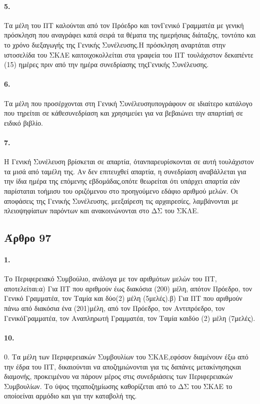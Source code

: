 \documentclass[a4paper,oneside, 10pt]{book}
\begin{document}
\paragraph { 5. } Τα μέλη του ΠΤ καλούνται από τον Πρόεδρο και τονΓενικό Γραμματέα με γενική πρόσκληση που αναγράφει κατά σειρά τα θέματα της ημερήσιας διάταξης, τοντόπο και το χρόνο διεξαγωγής της Γενικής Συνέλευσης.Η πρόσκληση αναρτάται στην ιστοσελίδα του ΣΚΛΕ καιτοιχοκολλείται στα γραφεία του ΠΤ τουλάχιστον δεκαπέντε (15) ημέρες πριν από την ημέρα συνεδρίασης τηςΓενικής Συνέλευσης.
\paragraph { 6. } Τα μέλη που προσέρχονται στη Γενική Συνέλευσηυπογράφουν σε ιδιαίτερο κατάλογο που τηρείται σε κάθεσυνεδρίαση και χρησιμεύει για να βεβαιώνει την απαρτίαή σε ειδικό βιβλίο.
\paragraph { 7. } Η Γενική Συνέλευση βρίσκεται σε απαρτία, ότανπαρευρίσκονται σε αυτή τουλάχιστον τα μισά από ταμέλη της. Αν δεν επιτευχθεί απαρτία, η συνεδρίαση αναβάλλεται για την ίδια ημέρα της επόμενης εβδομάδας,οπότε θεωρείται ότι υπάρχει απαρτία εάν παρίσταται τοήμισυ του οριζόμενου στο προηγούμενο εδάφιο αριθμού μελών. Οι αποφάσεις της Γενικής Συνέλευσης, μεεξαίρεση τις αρχαιρεσίες, λαμβάνονται με πλειοψηφίατων παρόντων και ανακοινώνονται στο ΔΣ του ΣΚΛΕ.
\subsection*{ Άρθρο 97 }
\paragraph { 1. } Το Περιφερειακό Συμβούλιο, ανάλογα με τον αριθμότων μελών του ΠΤ, αποτελείται:α) Για ΠΤ που αριθμούν έως διακόσια (200) μέλη, απότον Πρόεδρο, τον Γενικό Γραμματέα, τον Ταμία και δύο(2) μέλη (5μελές).β) Για ΠΤ που αριθμούν πάνω από διακόσια ένα (201)μέλη, από τον Πρόεδρο, τον Αντιπρόεδρο, τον ΓενικόΓραμματέα, τον Αναπληρωτή Γραμματέα, τον Ταμία καιδύο (2) μέλη (7μελές).
\paragraph { 10. } 0. Τα μέλη των Περιφερειακών Συμβουλίων του ΣΚΛΕ,εφόσον διαμένουν έξω από την έδρα του ΠΤ, δικαιούνται να αποζημιώνονται για τις δαπάνες μετακίνησηςκαι διαμονής, προκειμένου να πάρουν μέρος στις συνεδριάσεις των Περιφερειακών Συμβουλίων. Το ύψος τηςαποζημίωσης καθορίζεται από το ΔΣ του ΣΚΛΕ το οποίοείναι αρμόδιο και για την καταβολή της.
\end{document}
